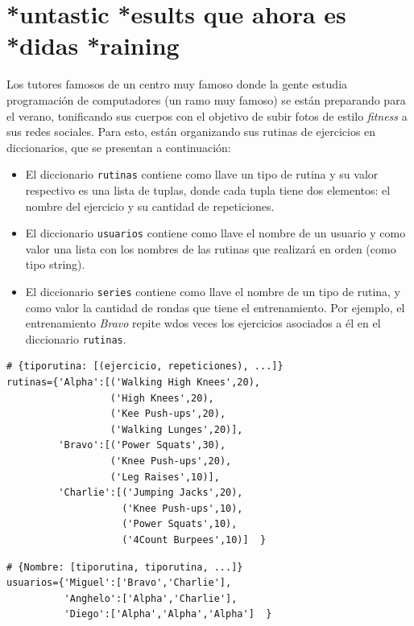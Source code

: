 \section{*untastic *esults que ahora es *didas *raining}

Los tutores famosos de un centro muy famoso donde la gente estudia programación de computadores (un ramo muy famoso) se están preparando para el verano, tonificando sus cuerpos con el objetivo de subir fotos de estilo \textit{fitness} a sus redes sociales. Para esto, están organizando sus rutinas de ejercicios en diccionarios, que se presentan a continuación:

\begin{itemize}
    \item El diccionario \texttt{rutinas} contiene como llave un tipo de rutina y su valor respectivo es una lista de tuplas, donde cada tupla tiene dos elementos: el nombre del ejercicio y su cantidad de repeticiones.
    
    \item El diccionario \texttt{usuarios} contiene como llave el nombre de un usuario y como valor una lista con los nombres de las rutinas que realizará en orden (como tipo string).
    
    \item El diccionario \texttt{series} contiene como llave el nombre de un tipo de rutina, y como valor la cantidad de rondas que tiene el entrenamiento. Por ejemplo, el entrenamiento \textit{Bravo} repite wdos veces los ejercicios asociados a él en el diccionario \texttt{rutinas}.
\end{itemize}

\begin{lstlisting}[style=consola]
# {tiporutina: [(ejercicio, repeticiones), ...]}
rutinas={'Alpha':[('Walking High Knees',20),
                  ('High Knees',20),
                  ('Kee Push-ups',20),
                  ('Walking Lunges',20)],
         'Bravo':[('Power Squats',30),
                  ('Knee Push-ups',20),
                  ('Leg Raises',10)],
         'Charlie':[('Jumping Jacks',20),
                    ('Knee Push-ups',10),
                    ('Power Squats',10),
                    ('4Count Burpees',10)]  }
\end{lstlisting}

\begin{lstlisting}[style=consola]
# {Nombre: [tiporutina, tiporutina, ...]}
usuarios={'Miguel':['Bravo','Charlie'],
          'Anghelo':['Alpha','Charlie'],
          'Diego':['Alpha','Alpha','Alpha']  }
\end{lstlisting}

